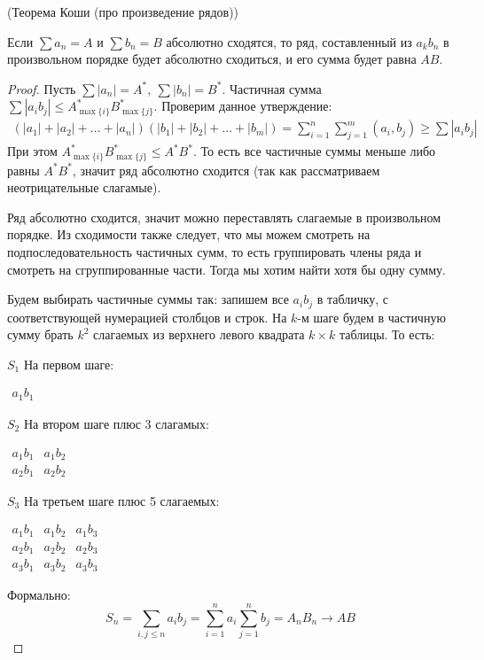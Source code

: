 \begin{theorem}
    (Теорема Коши (про произведение рядов)) 
    
    Если $\sum a_n = A$ и $\sum b_n = B$ абсолютно сходятся, то
    ряд, составленный из $a_kb_n$ в произвольном порядке будет абсолютно сходиться, и его сумма будет равна $AB$.
\end{theorem}
\begin{proof}
    Пусть $\sum |a_n| = A^*,\ \sum|b_n| = B^*$. Частичная сумма $\sum |a_i b_j| \leq A^*_{\max\{i\}}B^*_{\max\{j\}}$. Проверим данное утверждение:
    \begin{gather*}
        (|a_1| + |a_2| + \ldots + |a_n|)(|b_1| + |b_2|+\ldots + |b_m|) = \sum \limits_{i=1}^n \sum \limits_{j=1}^m (a_i, b_j) \geq \sum|a_i b_j|
    \end{gather*}
    При этом $A^*_{\max\{i\}} B^*_{\max\{j\}} \leqslant A^* B^*$. То есть все частичные суммы 
    меньше либо равны $A^*B^*$, значит ряд абсолютно сходится (так как рассматриваем неотрицательные слагамые).

    Ряд абсолютно сходится, значит можно переставлять слагаемые в произвольном порядке.
    Из сходимости также следует, что мы можем смотреть на подпоследовательность частичных сумм, то есть группировать
    члены ряда и смотреть на сгруппированные части. Тогда мы хотим найти хотя бы одну сумму.

    Будем выбирать частичные суммы так: запишем все $a_ib_j$ в табличку,
    с соответствующей нумерацией столбцов и строк. На $k$-м шаге
    будем в частичную сумму брать $k^2$ слагаемых из верхнего
    левого квадрата $k\times k$ таблицы. То есть:
      
    $S_1$ На первом шаге:
    \begin{center}
        $\begin{matrix}
            a_1b_1
        \end{matrix}$
    \end{center}
    $S_2$ На втором шаге плюс 3 слагамых:
    \begin{center}
        $\begin{matrix}
            a_1b_1 & a_1b_2 \\
            a_2b_1 & a_2b_2
        \end{matrix}$
    \end{center}
    $S_3$ На третьем шаге плюс 5 слагаемых:
    \begin{center}
        $\begin{matrix}
            a_1b_1 & a_1b_2 & a_1b_3 \\
            a_2b_1 & a_2b_2 & a_2b_3 \\
            a_3b_1 & a_3b_2 & a_3b_3
        \end{matrix}$
    \end{center}
    Формально:
    \begin{equation*}
        S_n = \sum_{i,j \leq n} a_ib_j = \sum_{i=1}^n a_i \sum_{j=1}^n b_j
        = A_nB_n \longrightarrow AB
    \end{equation*}

\end{proof}

